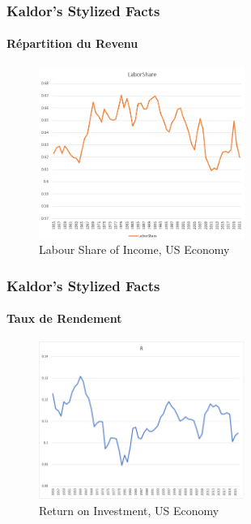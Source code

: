 \documentclass{beamer}
\begin{document}
\begin{frame}
    \frametitle{Kaldor's Stylized Facts}
    \hypertarget{income}{} %
    \framesubtitle{Répartition du Revenu}
        \begin{figure}
            \centering
            \includegraphics[width=0.6\textwidth]{graphs/labor_share.png}
            \caption{Labour Share of Income, US Economy
            \hyperlink{kaldor}{}}
        \end{figure}
\end{frame}

\begin{frame}
    \frametitle{Kaldor's Stylized Facts}
    \hypertarget{return}{} %
    \framesubtitle{Taux de Rendement}
        \begin{figure}
            \centering
            \includegraphics[width=0.6\textwidth]{graphs/r_usa.png}
            \caption{Return on Investment, US Economy}
        \end{figure}
\end{frame}


\end{document}
